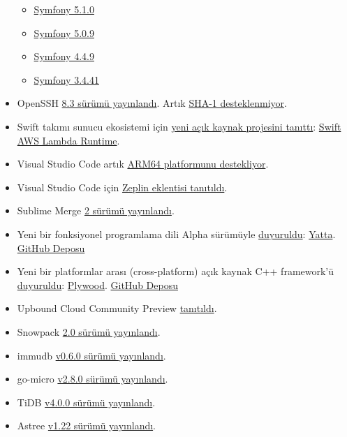 \documentclass[11pt]{article}
\begin{document}
\begin{itemize}
\begin{itemize}
\item \href{https://symfony.com/blog/symfony-5-1-0-released}{Symfony 5.1.0}
\item \href{https://symfony.com/blog/symfony-5-0-9-released}{Symfony 5.0.9}
\item \href{https://symfony.com/blog/symfony-4-4-9-released}{Symfony 4.4.9}
\item \href{https://symfony.com/blog/symfony-3-4-41-released}{Symfony 3.4.41}
\end{itemize}
\item OpenSSH \href{https://www.openssh.com/releasenotes.html}{8.3 sürümü yayınlandı}. Artık \href{https://arstechnica.com/information-technology/2020/05/dangerous-sha-1-crypto-function-is-about-to-die-in-ssh/}{SHA-1 desteklenmiyor}.
\item Swift takımı sunucu ekosistemi için \href{https://swift.org/blog/aws-lambda-runtime/}{yeni açık kaynak projesini tanıttı}:
\href{https://github.com/swift-server/swift-aws-lambda-runtime/}{Swift AWS Lambda Runtime}.
\item Visual Studio Code artık \href{https://github.com/microsoft/vscode/issues/33620\#issuecomment-635367046}{ARM64 platformunu destekliyor}.
\item Visual Studio Code için \href{https://blog.zeplin.io/introducing-zeplin-for-visual-studio-code-edbc922a5784}{Zeplin eklentisi tanıtıldı}.
\item Sublime Merge \href{https://www.sublimetext.com/blog/articles/sublime-merge-2-announcement}{2 sürümü yayınlandı}.
\item Yeni bir fonksiyonel programlama dili Alpha sürümüyle \href{https://functional.blog/2020/05/25/designing-a-functional-programming-language-yatta/}{duyuruldu}: \href{https://yatta-lang.org/}{Yatta}.
\href{https://github.com/yatta-lang/yatta}{GitHub Deposu}
\item Yeni bir platformlar arası (cross-platform) açık kaynak C++ framework'ü
\href{https://preshing.com/20200526/a-new-cross-platform-open-source-cpp-framework/}{duyuruldu}: \href{https://plywood.arc80.com/}{Plywood}. \href{https://github.com/arc80/plywood}{GitHub Deposu}
\item Upbound Cloud Community Preview \href{https://blog.upbound.io/announcing-upbound-cloud-community-preview/}{tanıtıldı}.
\item Snowpack \href{https://www.snowpack.dev/posts/2020-05-26-snowpack-2-0-release/}{2.0 sürümü yayınlandı}.
\item immudb \href{https://github.com/codenotary/immudb/releases/tag/v0.6.0}{v0.6.0 sürümü yayınlandı}.
\item go-micro \href{https://github.com/micro/go-micro/releases/tag/v2.8.0}{v2.8.0 sürümü yayınlandı}.
\item TiDB \href{https://github.com/pingcap/tidb/releases/tag/v4.0.0}{v4.0.0 sürümü yayınlandı}.
\item Astree \href{http://edeforas.free.fr/?p=305}{v1.22 sürümü yayınlandı}.
\end{itemize}
\end{document}
